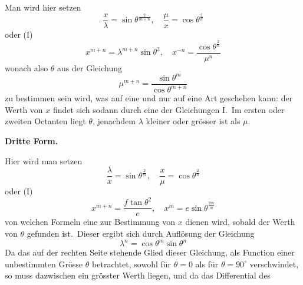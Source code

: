 \documentclass[12pt,a4paper]{article}
\theoremstyle{plain}
\begin{document}
Man wird hier setzen
\[
\frac{x}{\lambda} = \sin\theta^{\frac{2}{m+n}}, \quad \frac{\mu}{x} = \cos\theta^{\frac{2}{n}}
\]
oder (I)
\[
x^{m+n} = \lambda^{m+n} \sin\theta^2, \quad x^{-n} = \frac{\cos\theta^{\frac{2}{n}}}{\mu^n}
\]
wonach also $\theta$ aus der Gleichung
\[
\mu^{m+n} = \frac{\sin\theta^m}{\cos\theta^{m+n}}
\]
zu bestimmen sein wird, was auf eine und nur auf eine Art geschehen kann: der
Werth von $x$ findet sich sodann durch eine der Gleichungen I.\ Im ersten oder zweiten Octanten liegt $\theta$, jenachdem $\lambda$ kleiner oder grösser ist als $\mu$.

\textbf{Dritte Form.}

Hier wird man setzen
\[
\frac{\lambda}{x} = \sin\theta^{\frac{2}{m}}, \quad \frac{x}{\mu} = \cos\theta^{\frac{2}{n}}
\]
oder (I)
\[
x^{m+n} = \frac{f \tan\theta^2}{e}, \quad x^m = e \sin\theta^{\frac{2m}{m}}
\]
von welchen Formeln eine zur Bestimmung von $x$ dienen wird, sobald der Werth
von $\theta$ gefunden ist.\ Dieser ergibt sich durch Auflösung der Gleichung
\[
\lambda^n = \cos\theta^m \sin\theta^n
\]
Da das auf der rechten Seite stehende Glied dieser Gleichung, als Function einer unbestimmten Grösse $\theta$ betrachtet, sowohl für $\theta = 0$ als für $\theta = 90^\circ$ verschwindet, so muss dazwischen ein grösster Werth liegen, und da das Differential des
\end{document}
